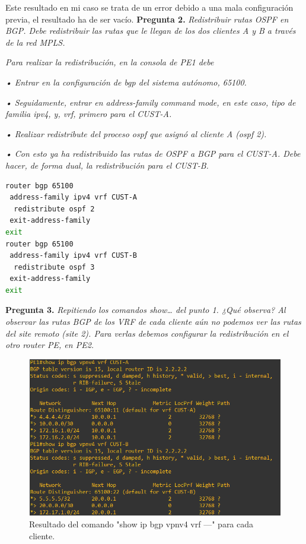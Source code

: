 \documentclass[a4paper, 12pt]{report}
\begin{document}
Este resultado en mi caso se trata de un error debido a una mala configuración previa, el resultado ha de ser vacío.
\newpage
\textbf{Pregunta 2.}
\textit{Redistribuir rutas OSPF en BGP. Debe redistribuir las rutas que le llegan de los dos clientes A
y B a través de la red MPLS.}

\textit{Para realizar la redistribución, en la consola de PE1 debe}

\textit{• Entrar en la configuración de bgp del sistema autónomo, 65100.}

\textit{• Seguidamente, entrar en address-family command mode, en este caso, tipo de familia
ipv4, y, vrf, primero para el CUST-A.}

\textit{• Realizar redistribute del proceso ospf que asignó al cliente A (ospf 2).}

\textit{• Con esto ya ha redistribuido las rutas de OSPF a BGP para el CUST-A. Debe hacer, de
forma dual, la redistribución para el CUST-B.}

\begin{lstlisting}[language=bash, caption={Configuración de bgp en PE1}]
router bgp 65100
 address-family ipv4 vrf CUST-A
  redistribute ospf 2
 exit-address-family
exit
router bgp 65100
 address-family ipv4 vrf CUST-B
  redistribute ospf 3
 exit-address-family
exit
\end{lstlisting}
\textbf{Pregunta 3.}
\textit{
	Repitiendo los comandos show… del punto 1. ¿Qué observa?
Al observar las rutas BGP de los VRF de cada cliente aún no podemos ver las rutas del site
remoto (site 2). Para verlas debemos configurar la redistribución en el otro router PE, en PE2.
}
\begin{figure}[H]
	\centering
	\includegraphics[scale=0.7]{showipbgpNUEVO.png}
	\caption{Resultado del comando "show ip bgp vpnv4 vrf ---" para cada cliente.}
	\label{fig:showipbgpNUEVO}
\end{figure}
\end{document}
